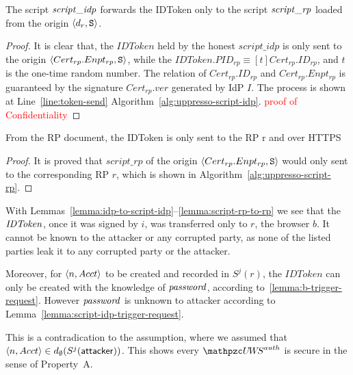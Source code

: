   
  \begin{lemma}\label{lemma:script-idp-to-script-rp} %
    The script $\mathit{script\_idp}$ forwards the IDToken only to 
    the script $\mathit{script\_rp}$ loaded from the origin 
    $\langle d_r, \mathtt{S}\rangle$.
  \end{lemma}
  \begin{proof}
    It is clear that, the $IDToken$ held by the honest 
    $script\_idp$ is only sent to the origin 
    $\langle Cert_{rp}.Enpt_{rp}, \mathtt{S}\rangle$, 
    while the $IDToken.PID_{rp} \equiv [t]Cert_{rp}.ID_{rp}$, 
    and $t$ is the one-time random number. The relation of 
    $Cert_{rp}.ID_{rp}$ and $Cert_{rp}.Enpt_{rp}$ is guaranteed 
    by the signature $Cert_{rp}.ver$ generated by IdP $I$. 
    The process is shown at Line~\ref{line:token-send}
    Algorithm~\ref{alg:uppresso-script-idp}.
    \textcolor{red}{proof of Confidentiality}
  \end{proof}
  
  \begin{lemma}\label{lemma:script-rp-to-rp} %
    From the RP document, the IDToken is only sent to the RP r 
    and over HTTPS
  \end{lemma}
  \begin{proof}
    It is proved that $script\_rp$ of the origin 
    $\langle Cert_{rp}.Enpt_{rp}, \mathtt{S}\rangle$ 
    would only sent to the corresponding RP $r$, 
    which is shown in Algorithm~\ref{alg:uppresso-script-rp}.
  \end{proof}
  

  
  With Lemmas~\ref{lemma:idp-to-script-idp}--\ref{lemma:script-rp-to-rp} we see that the $\mathit{IDToken}$, once it was signed by $i$, was transferred only to $r$, the browser $b$. It cannot be known to the attacker or any corrupted party, as none of the listed parties leak it to any corrupted party or the attacker.

Moreover, for $\langle n,Acct\rangle$ to be created and recorded in $S^j(r)$, the $IDToken$ can only be created with the knowledge of $\mathit{password}$, according to~\ref{lemma:b-trigger-request}. However $\mathit{password}$ is unknown to attacker according to Lemma~\ref{lemma:script-idp-trigger-request}. 

This is a contradication to the assumption, where we assumed that
$\langle n,Acct\rangle \in d_{\emptyset}(S^j(\mathsf{attacker}))$. This shows
every $\uppressoauthwebsystem$ is secure in the sense of Property~A.
  
